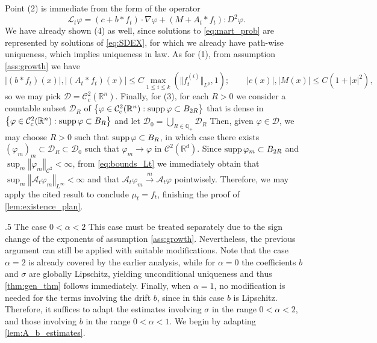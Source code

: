 \documentclass[10pt,oneside]{amsart}
\makeatletter
\def\subsection{\@startsection{subsection}{2}%
  \z@{.5\linespacing\@plus.7\linespacing}
{.5\baselineskip}%
  {\normalfont\centering\scshape}%
}
\numberwithin{equation}{section}
\numberwithin{definition}{section}
\numberwithin{theorem}{section}
\numberwithin{lemma}{section}
\makeatother
\begin{document}
%
Point (2) is immediate from the form of the operator
%
\begin{equation*}
  \mathcal{L}_{t}\varphi=\left(c+b*f_{t}\right)\cdot\nabla\varphi+\left(M+A_{t}*f_{t}\right):D^{2}\varphi.
\end{equation*}
%
We have already shown (4) as well, since solutions to \cref{eq:mart_prob} are represented by solutions of \cref{eq:SDEX}, for which we already have path-wise uniqueness, which implies uniqueness in law. As for (1), from assumption \ref{ass:growth} we have
%
\begin{equation}\label{eq:bounds_Lt}
  \left|(b*f_{t})(x)\right|,\left|(A_{t}*f_{t})(x)\right|\leq 
  C\max_{1\leq i\leq k}(\Vert f_{t}^{(i)}\Vert_{L^p},1);\qquad
  \left|c(x)\right|,\left|M(x)\right|\leq C\left(1+|x|^2\right),
\end{equation}
%
so we may pick $\mathcal D = \mathcal C^2_c(\mathbb R^n)$. Finally, for (3), for each $R>0$ we consider a countable subset $\mathcal D_R$ of $\left\{ \varphi\in\mathcal{C}_{c}^{2}(\mathbb{R}^{n}):\textnormal{supp}\,\varphi\subset B_{2R}\right\} $ that is dense in $\left\{ \varphi\in\mathcal{C}_{c}^{2}(\mathbb{R}^{n}):\textnormal{supp}\,\varphi\subset B_{R}\right\}$  and let $\mathcal{D}_{0}=\bigcup_{R\in\mathbb{Q}_{+}}\mathcal{D}_{R}$ Then, given $\varphi\in\mathcal{D}$, we may choose $R>0$ such that $\textnormal{supp}\,\varphi\subset B_{R}$, in which case there exists $(\varphi_{m})_{m}\subset\mathcal{D}_{R}\subset\mathcal{D}_{0}$ such that $\varphi_{m}\to\varphi$  in $\mathcal{C}^{2}(\mathbb{R}^{d})$. Since $\textnormal{supp}\,\varphi_{m}\subset B_{2R}$ and $\sup_{m}\left\Vert \varphi_{m}\right\Vert _{\mathcal{C}^{2}}<\infty$, from \cref{eq:bounds_Lt} we immediately obtain that $\sup_{m}\left\Vert \mathcal{A}_{t}\varphi_{m}\right\Vert _{L^{\infty}}<\infty$  and that $\mathcal{A}_{t}\varphi_{m}\overset{m}{\to}\mathcal{A}_{t}\varphi$  pointwisely. Therefore, we may apply the cited result to conclude $\mu_t = f_t$, finishing the proof of \cref{lem:existence_plan}.

\subsection{The case $0< \alpha < 2$}\label{subsec:soft_pot_modif}
% 
This case must be treated separately due to the sign change of the exponents of assumption \ref{ass:growth}. Nevertheless, the previous argument can still be applied with suitable modifications. Note that the case $\alpha = 2$ is already covered by the earlier analysis, while for $\alpha = 0$ the coefficients $b$ and $\sigma$ are globally Lipschitz, yielding unconditional uniqueness and thus \cref{thm:gen_thm} follows immediately. Finally, when $\alpha = 1$, no modification is needed for the terms involving the drift $b$, since in this case $b$ is Lipschitz. Therefore, it suffices to adapt the estimates involving $\sigma$ in the range $0 < \alpha < 2$, and those involving $b$ in the range $0 < \alpha < 1$. We begin by adapting \cref{lem:A_b_estimates}.
\end{document}
